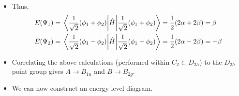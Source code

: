 \documentclass[../notes.tex]{subfiles}
\begin{document}
\begin{itemize}
\begin{itemize}
        \item Thus,
        \begin{align*}
            E(\Psi_1) &= \ev{\hat{H}}{\frac{1}{\sqrt{2}}(\phi_1+\phi_2)} = \frac{1}{2}(2\alpha+2\beta) = \beta\\
            E(\Psi_2) &= \ev{\hat{H}}{\frac{1}{\sqrt{2}}(\phi_1-\phi_2)} = \frac{1}{2}(2\alpha-2\beta) = -\beta
        \end{align*}
        \item Correlating the above calculations (performed within $C_2\subset D_{2h}$) to the $D_{2h}$ point group gives $A\to B_{1u}$ and $B\to B_{2g}$.
        \item We can now construct an energy level diagram.
        \begin{figure}[h!]
            \centering
\end{figure}
\end{itemize}
\end{itemize}
\end{document}
